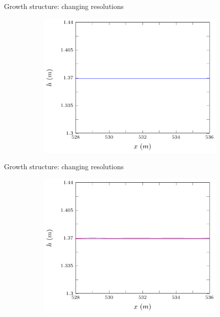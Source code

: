 \documentclass[pdf]{beamer}
\begin{document}
\begin{frame}{Growth structure: changing resolutions}
	\begin{figure}
		\begin{subfigure}{0.75\textwidth}
			\includegraphics[width=\textwidth]{../Pics/dx0/4/4-figure0.pdf}
		\end{subfigure}
	\end{figure}
\end{frame}

\begin{frame}{Growth structure: changing resolutions}
	\begin{figure}
		\begin{subfigure}{0.75\textwidth}
			\includegraphics[width=\textwidth]{../Pics/dx0/46/4-figure0.pdf}
		\end{subfigure}
	\end{figure}
\end{frame}
\end{document}

